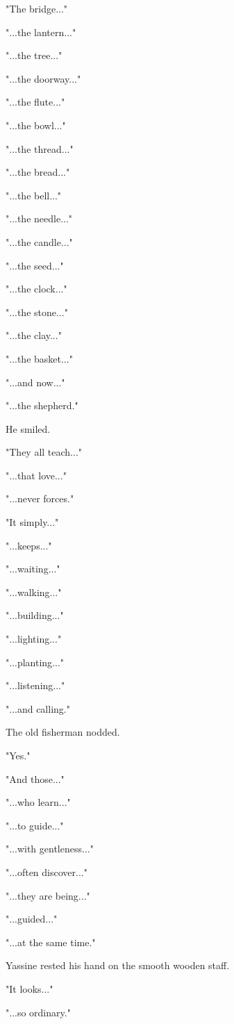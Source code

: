 \documentclass[12pt,openany]{book}
\begin{document}
"The bridge..."

"...the lantern..."

"...the tree..."

"...the doorway..."

"...the flute..."

"...the bowl..."

"...the thread..."

"...the bread..."

"...the bell..."

"...the needle..."

"...the candle..."

"...the seed..."

"...the clock..."

"...the stone..."

"...the clay..."

"...the basket..."

"...and now..."

"...the shepherd."

He smiled.

"They all teach..."

"...that love..."

"...never forces."

"It simply..."

"...keeps..."

"...waiting..."

"...walking..."

"...building..."

"...lighting..."

"...planting..."

"...listening..."

"...and calling."

The old fisherman nodded.

"Yes."

"And those..."

"...who learn..."

"...to guide..."

"...with gentleness..."

"...often discover..."

"...they are being..."

"...guided..."

"...at the same time."

Yassine rested his hand on the smooth wooden staff.

"It looks..."

"...so ordinary."
\end{document}
